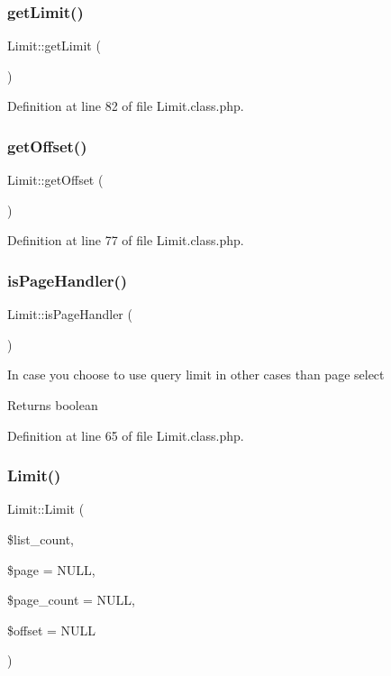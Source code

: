\subsubsection{\texorpdfstring{get\+Limit()}{getLimit()}}
{\footnotesize\ttfamily Limit\+::get\+Limit (\begin{DoxyParamCaption}{ }\end{DoxyParamCaption})}



Definition at line 82 of file Limit.\+class.\+php.

\mbox{\label{classLimit_a5dfd9d778f1cfbdaee6114f707a82b48}} 
\subsubsection{\texorpdfstring{get\+Offset()}{getOffset()}}
{\footnotesize\ttfamily Limit\+::get\+Offset (\begin{DoxyParamCaption}{ }\end{DoxyParamCaption})}



Definition at line 77 of file Limit.\+class.\+php.

\mbox{\label{classLimit_a3a30a3752791c509c01ee9b52e774a3c}} 
\subsubsection{\texorpdfstring{is\+Page\+Handler()}{isPageHandler()}}
{\footnotesize\ttfamily Limit\+::is\+Page\+Handler (\begin{DoxyParamCaption}{ }\end{DoxyParamCaption})}

In case you choose to use query limit in other cases than page select \begin{DoxyReturn}{Returns}
boolean 
\end{DoxyReturn}


Definition at line 65 of file Limit.\+class.\+php.

\mbox{\label{classLimit_a3f29df69e167ae9fe5ae3f6b4adebb34}} 
\subsubsection{\texorpdfstring{Limit()}{Limit()}}
{\footnotesize\ttfamily Limit\+::\+Limit (\begin{DoxyParamCaption}\item[{}]{\$list\+\_\+count,  }\item[{}]{\$page = {\ttfamily NULL},  }\item[{}]{\$page\+\_\+count = {\ttfamily NULL},  }\item[{}]{\$offset = {\ttfamily NULL} }\end{DoxyParamCaption})}

